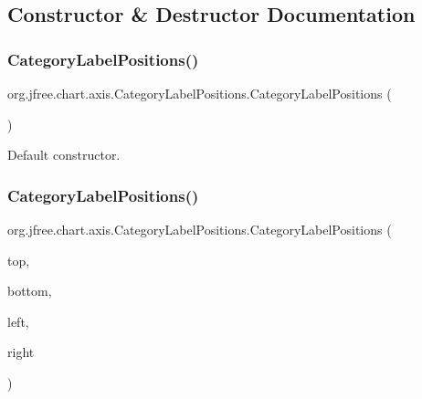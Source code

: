 \subsection{Constructor \& Destructor Documentation}
\mbox{\label{classorg_1_1jfree_1_1chart_1_1axis_1_1_category_label_positions_ac51d8b208b46dc8f7e5adfd72534d801}} 
\subsubsection{\texorpdfstring{Category\+Label\+Positions()}{CategoryLabelPositions()}\hspace{0.1cm}{\footnotesize\ttfamily [1/2]}}
{\footnotesize\ttfamily org.\+jfree.\+chart.\+axis.\+Category\+Label\+Positions.\+Category\+Label\+Positions (\begin{DoxyParamCaption}{ }\end{DoxyParamCaption})}

Default constructor. \mbox{\label{classorg_1_1jfree_1_1chart_1_1axis_1_1_category_label_positions_aa4cd6d8a36641044a8b123cf7c76016c}} 
\subsubsection{\texorpdfstring{Category\+Label\+Positions()}{CategoryLabelPositions()}\hspace{0.1cm}{\footnotesize\ttfamily [2/2]}}
{\footnotesize\ttfamily org.\+jfree.\+chart.\+axis.\+Category\+Label\+Positions.\+Category\+Label\+Positions (\begin{DoxyParamCaption}\item[{\mbox{\hyperlink{classorg_1_1jfree_1_1chart_1_1axis_1_1_category_label_position}{Category\+Label\+Position}}}]{top,  }\item[{\mbox{\hyperlink{classorg_1_1jfree_1_1chart_1_1axis_1_1_category_label_position}{Category\+Label\+Position}}}]{bottom,  }\item[{\mbox{\hyperlink{classorg_1_1jfree_1_1chart_1_1axis_1_1_category_label_position}{Category\+Label\+Position}}}]{left,  }\item[{\mbox{\hyperlink{classorg_1_1jfree_1_1chart_1_1axis_1_1_category_label_position}{Category\+Label\+Position}}}]{right }\end{DoxyParamCaption})}

